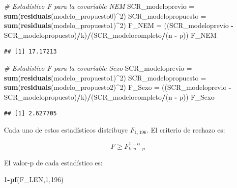 \documentclass[
  11pt,
]{book}
\newenvironment{Shaded}{\begin{snugshade}}{\end{snugshade}}
\newcommand{\CommentTok}[1]{\textcolor[rgb]{0.56,0.35,0.01}{\textit{#1}}}
\newcommand{\DecValTok}[1]{\textcolor[rgb]{0.00,0.00,0.81}{#1}}
\newcommand{\FunctionTok}[1]{\textcolor[rgb]{0.13,0.29,0.53}{\textbf{#1}}}
\newcommand{\NormalTok}[1]{#1}
\newcommand{\OtherTok}[1]{\textcolor[rgb]{0.56,0.35,0.01}{#1}}
\newcommand{\SpecialCharTok}[1]{\textcolor[rgb]{0.81,0.36,0.00}{\textbf{#1}}}
\theoremstyle{definition}
\theoremstyle{definition}
\theoremstyle{definition}
\theoremstyle{definition}
\theoremstyle{remark}
\begin{document}
\begin{Shaded}
\begin{Highlighting}[]
\CommentTok{\# Estadístico F para la covariable NEM}
\NormalTok{SCR\_modeloprevio }\OtherTok{=} \FunctionTok{sum}\NormalTok{(}\FunctionTok{residuals}\NormalTok{(modelo\_propuesto0)}\SpecialCharTok{\^{}}\DecValTok{2}\NormalTok{)}
\NormalTok{SCR\_modelopropuesto }\OtherTok{=} \FunctionTok{sum}\NormalTok{(}\FunctionTok{residuals}\NormalTok{(modelo\_propuesto1)}\SpecialCharTok{\^{}}\DecValTok{2}\NormalTok{)}
\NormalTok{F\_NEM }\OtherTok{=}\NormalTok{ ((SCR\_modeloprevio }\SpecialCharTok{{-}}\NormalTok{ SCR\_modelopropuesto)}\SpecialCharTok{/}\NormalTok{k)}\SpecialCharTok{/}\NormalTok{(SCR\_modelocompleto}\SpecialCharTok{/}\NormalTok{(n }\SpecialCharTok{{-}}\NormalTok{ p))}
\NormalTok{F\_NEM}
\end{Highlighting}
\end{Shaded}

\begin{verbatim}
## [1] 17.17213
\end{verbatim}

\begin{Shaded}
\begin{Highlighting}[]
\CommentTok{\# Estadístico F para la covariable Sexo}
\NormalTok{SCR\_modeloprevio }\OtherTok{=} \FunctionTok{sum}\NormalTok{(}\FunctionTok{residuals}\NormalTok{(modelo\_propuesto1)}\SpecialCharTok{\^{}}\DecValTok{2}\NormalTok{)}
\NormalTok{SCR\_modelopropuesto }\OtherTok{=} \FunctionTok{sum}\NormalTok{(}\FunctionTok{residuals}\NormalTok{(modelo\_propuesto2)}\SpecialCharTok{\^{}}\DecValTok{2}\NormalTok{)}
\NormalTok{F\_Sexo }\OtherTok{=}\NormalTok{ ((SCR\_modeloprevio }\SpecialCharTok{{-}}\NormalTok{ SCR\_modelopropuesto)}\SpecialCharTok{/}\NormalTok{k)}\SpecialCharTok{/}\NormalTok{(SCR\_modelocompleto}\SpecialCharTok{/}\NormalTok{(n }\SpecialCharTok{{-}}\NormalTok{ p))}
\NormalTok{F\_Sexo}
\end{Highlighting}
\end{Shaded}

\begin{verbatim}
## [1] 2.627705
\end{verbatim}

Cada uno de estos estadísticos distribuye \(F_{1,196}\). El criterio de rechazo es:

\[
F \geq F_{k, n-p}^{1-\alpha}
\]

El valor-p de cada estadístico es:

\begin{Shaded}
\begin{Highlighting}[]
\DecValTok{1}\SpecialCharTok{{-}}\FunctionTok{pf}\NormalTok{(F\_LEN,}\DecValTok{1}\NormalTok{,}\DecValTok{196}\NormalTok{)}
\end{Highlighting}
\end{Shaded}
\end{document}
